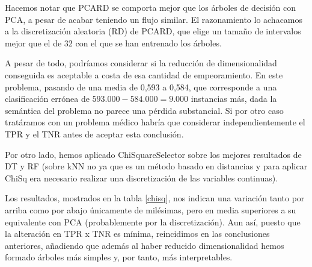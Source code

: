 Hacemos notar que PCARD se comporta mejor que los árboles de decisión con PCA, a pesar de acabar teniendo un flujo similar. El razonamiento lo achacamos a la discretización aleatoria (RD) de PCARD, que elige un tamaño de intervalos mejor que el de 32 con el que se han entrenado los árboles.

\vspace{\baselineskip}

A pesar de todo, podríamos considerar si la reducción de dimensionalidad conseguida es aceptable a costa de esa cantidad de empeoramiento. En este problema, pasando de una media de 0,593 a 0,584, que corresponde a una clasificación errónea de $593.000 - 584.000 = 9.000$ instancias más, dada la semántica del problema no parece una pérdida substancial. Si por otro caso tratáramos con un problema médico habría que considerar independientemente el TPR y el TNR antes de aceptar esta conclusión.

\vspace{\baselineskip}

Por otro lado, hemos aplicado ChiSquareSelector sobre los mejores resultados de DT y RF (sobre kNN no ya que es un método basado en distancias y para aplicar ChiSq era necesario realizar una discretización de las variables continuas). 

Los resultados, mostrados en la tabla \ref{chisq}, nos indican una variación tanto por arriba como por abajo únicamente de milésimas, pero en media superiores a su equivalente con PCA (probablemente por la discretización). Aun así, puesto que la alteración en TPR x TNR es mínima, reincidimos en las conclusiones anteriores, añadiendo que además al haber reducido dimensionalidad hemos formado árboles más simples y, por tanto, más interpretables.

